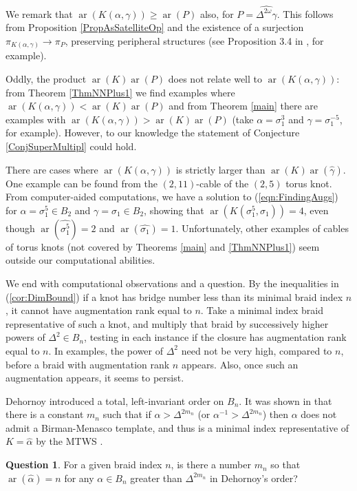 \documentclass[11pt]{amsart}
\def\s{{\sigma}}
\def\ar{\operatorname{ar}}
\theoremstyle{definition}
\begin{document}
We remark that $\ar(K(\alpha,\gamma))\ge \ar(P)$ also, for $P=\widehat{\Delta^{2\omega}\gamma}$. This follows from Proposition \ref{PropAsSatelliteOp} and the existence of a surjection $\pi_{K(\alpha,\gamma)}\to\pi_P$, preserving peripheral structures (see Proposition 3.4 in \cite{SW}, for example). 

Oddly, the product $\ar(K)\ar(P)$ does not relate well to $\ar(K(\alpha,\gamma))$: from Theorem \ref{ThmNNPlus1} we find examples where $\ar(K(\alpha,\gamma))<\ar(K)\ar(P)$ and from Theorem \ref{main} there are examples with $\ar(K(\alpha,\gamma))>\ar(K)\ar(P)$ (take $\alpha=\s_1^3$ and $\gamma=\s_1^{-5}$, for example). However, to our knowledge the statement of Conjecture \ref{ConjSuperMultipl} could hold. 

There are cases where $\ar(K(\alpha,\gamma))$ is strictly larger than $\ar(K)\ar(\hat{\gamma})$. One example can be found from the $(2,11)$-cable of the $(2,5)$ torus knot. From computer-aided computations, we have a solution to (\ref{eqn:FindingAugs}) for $\alpha = \s_1^5\in B_2$ and $\gamma=\s_1\in B_2$, showing that $\ar(K(\s_1^5,\s_1)) = 4$, even though $\ar(\hat{\s_1^5})=2$ and $\ar(\hat{\s_1})=1$. Unfortunately, other examples of cables of torus knots (not covered by Theorems \ref{main} and \ref{ThmNNPlus1}) seem outside our computational abilities.

We end with computational observations and a question. By the inequalities in (\ref{cor:DimBound}) if a knot has bridge number less than its minimal braid index $n$, it cannot have augmentation rank equal to $n$. Take a minimal index braid representative of such a knot, and multiply that braid by successively higher powers of $\Delta^2\in B_n$, testing in each instance if the closure has augmentation rank equal to $n$. In examples, the power of $\Delta^2$ need not be very high, compared to $n$, before a braid with augmentation rank $n$ appears. Also, once such an augmentation appears, it seems to persist. 

Dehornoy introduced a total, left-invariant order on $B_n$. It was shown in \cite{MN} that there is a constant $m_n$ such that if $\alpha>\Delta^{2m_n}$ (or $\alpha^{-1}>\Delta^{2m_n}$) then $\alpha$ does not admit a Birman-Menasco template, and thus is a minimal index representative of $K=\hat\alpha$ by the MTWS \cite{BM_MTWS}. 

\newtheorem*{ques}{Question}
\begin{ques}For a given braid index $n$, is there a number $m_n$ so that $\ar(\hat\alpha)=n$ for any $\alpha\in B_n$ greater than $\Delta^{2m_n}$ in Dehornoy's order?
\end{ques}



\end{document}
